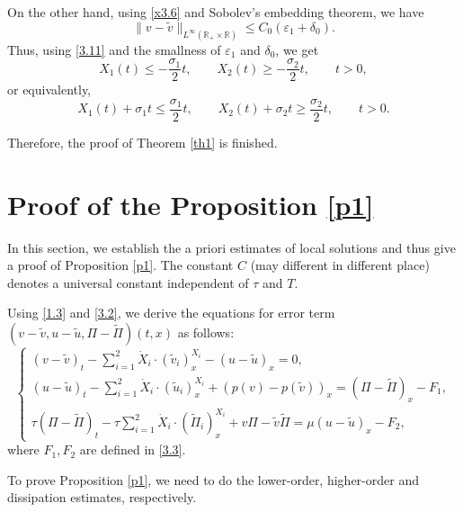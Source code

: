 \documentclass[10pt,reqno]{amsart}
\numberwithin{equation}{section}
\newcommand{\SUM}[3]{\sum\limits_{{#1}={#2}}^{#3}}
\begin{document}
On the other hand, using  \eqref{x3.6} and Sobolev's embedding theorem, we have
\[
\|v-\widetilde v\|_{L^{\infty}(\mathbb{R}_+\times \mathbb{R})}\le C_0(\varepsilon_1+\delta_0).
\]
Thus,  using \eqref{3.11} and the smallness of $\varepsilon_1$ and $\delta_0$, we get
\[
X_1(t)\le -\frac{\sigma_1}{2}t, \qquad X_2(t)\ge -\frac{\sigma_2}{2}t,\qquad t >0,
\]
or equivalently,
\begin{equation}\label{1225-3}
X_1(t)+\sigma_1t\le \frac{\sigma_1}{2}t,\qquad X_2(t)+\sigma_2t\ge \frac{\sigma_2}{2}t, \qquad t >0.
\end{equation}

Therefore,  the proof of Theorem \ref{th1} is finished.
\section{Proof of the Proposition \ref{p1}}
In this section, we establish the a priori estimates  of local solutions and thus give a proof of Proposition \ref{p1}. The constant $C$ (may different in different place) denotes a universal constant independent of $\tau$ and $T$.

Using \eqref{1.3} and \eqref{3.2}, we derive the equations for error term $(v-\widetilde{v},u-\widetilde{u},\Pi-\widetilde{\Pi})(t,x)$ as follows:
\begin{equation}\label{4.1}
\begin{cases}
(v-\widetilde{v})_t-\SUM i 1 2 \dot{X}_i \cdot (\widetilde{v}_i)^{X_i}_x-(u-\widetilde{u})_x=0,\\
(u-\widetilde{u})_t-\SUM i 1 2 \dot{X}_i \cdot (\widetilde{u}_i)^{X_i}_x+\left(p(v)-p(\widetilde{v})\right)_x
=(\Pi-\widetilde{\Pi})_x-F_1,\\
\tau(\Pi-\widetilde{\Pi})_t-\tau\SUM i 1 2\dot{X}_i \cdot (\widetilde{\Pi}_i)^{X_i}_x+v\Pi-\widetilde{v}\widetilde{\Pi}
=\mu(u-\widetilde{u})_x-F_2,
\end{cases}
\end{equation}
where $F_1,F_2$ are defined in \eqref{3.3}.

To prove Proposition \ref{p1}, we need to do  the lower-order, higher-order and dissipation estimates, respectively.
\end{document}
